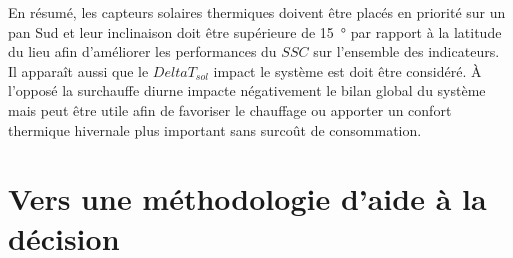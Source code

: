 En résumé, les capteurs solaires thermiques doivent être placés en priorité sur un
pan Sud et leur inclinaison doit être supérieure de \SI{15}{\degree} par rapport à
la latitude du lieu afin d’améliorer les performances du $SSC$ sur l’ensemble des indicateurs.
Il apparaît aussi que le $DeltaT_{sol}$ impact le système est doit être considéré. À l’opposé
la surchauffe diurne impacte négativement le bilan global du système mais peut être utile
afin de favoriser le chauffage ou apporter un confort thermique hivernale plus important
sans surcoût de consommation.





\section{Vers une méthodologie d’aide à la décision} %
\label{sec:vers_une_methodologie_d_aide_a_la_decision}



























